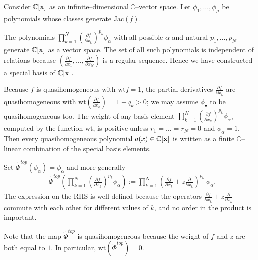 \documentclass[12pt,a4paper]{amsart}
\newcommand{\CC}{{\mathbb{C}}}
\newcommand{\Jac}{\mathrm{Jac}}
\newcommand{\bx}{{\bf x}}
\newcommand{\wt}{\mathrm{wt}}
\newcommand{\p}{{\partial}}
\newcommand{\<}{\left<}
\renewcommand{\>}{\right>}
\numberwithin{equation}{section}
\begin{document}
Consider $\CC[\bx]$ as an infinite--dimensional $\CC$--vector space. Let $\phi_1,\dots,\phi_\mu$ be polynomials whose classes generate $\Jac(f)$.

The polynomials $\prod_{k=1}^N \left(\frac{\p f}{\p x_k} \right)^{p_k} \phi_\alpha$ with all possible $\alpha$ and natural $p_1,\dots,p_N$ generate $\CC[\bx]$ as a vector space. The set of all such polynomials is independent of relations because $(\frac{\p f}{\p x_1},\dots,\frac{\p f}{\p x_N})$ is a regular sequence. Hence we have constructed a special basis of $\CC[\bx]$.

Because $f$ is quasihomogeneous with $\wt f = 1$, the partial derivatives $\frac{\p f}{\p x_k}$ are quasihomogeneous with $\wt (\frac{\p f}{\p x_k}) = 1 - q_k > 0$; we may assume $\phi_\bullet$ to be quasihomogeneous too. The weight of any basis element $\prod_{k=1}^N \left(\frac{\p f}{\p x_k} \right)^{p_k} \phi_\alpha$, computed by the function $\wt$, is positive unless $r_1=\dots = r_N = 0$ and $\phi_\alpha=1$.
Then every quasihomogeneous polynomial $a(x) \in \CC[\bx]$ is written as a finite $\CC$--linear combination of the special basis elements.


Set $\widetilde \Phi^{top} (\phi_\alpha) = \phi_\alpha$ and more generally
\begin{align}
    & \widetilde \Phi^{top} \left( \prod_{k=1}^N \left(\frac{\p f}{\p x_k} \right)^{p_k} \phi_\alpha \right) := \prod_{k=1}^N \left( \frac{\p f}{\p x_k} + z \frac{\p}{\p x_k} \right)^{p_k} \ \phi_\alpha.
\end{align}
The expression on the RHS is well-defined because the operators $\frac{\p f}{\p x_k} + z \frac{\p}{\p x_k}$ commute with each other for different values of $k$, and no order in the product is important.

Note that the map $\widetilde \Phi^{top}$ is quasihomogeneous because the weight of $f$ and $z$ are both equal to $1$. In particular, $\wt (\widetilde \Phi^{top}) = 0$.
\end{document}
